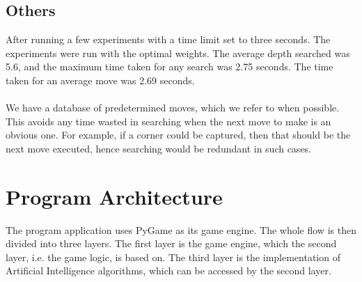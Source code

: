 \documentclass[letterpaper,12pt]{article}
\begin{document}
\subsection{Others}

After running a few experiments with a time limit set to three seconds. The experiments were run with the optimal weights. The average depth searched was 5.6, and the maximum time taken for any search
was 2.75 seconds. The time taken for an average move was 2.69 seconds.\\\\
\noindent
We have a database of predetermined moves, which we refer to when possible. This avoids any time wasted in  searching when the next move to make is an obvious one. For example, if a corner could be captured, then that should be the next move executed, hence searching would be redundant in such cases.

\section{Program Architecture}

The program application uses PyGame as its game engine. The whole flow is then divided into three layers. The first layer is the game engine, which the second layer, i.e. the game logic, is based on. The third layer is the implementation of Artificial Intelligence algorithms, which can be accessed by the second layer.
\end{document}
